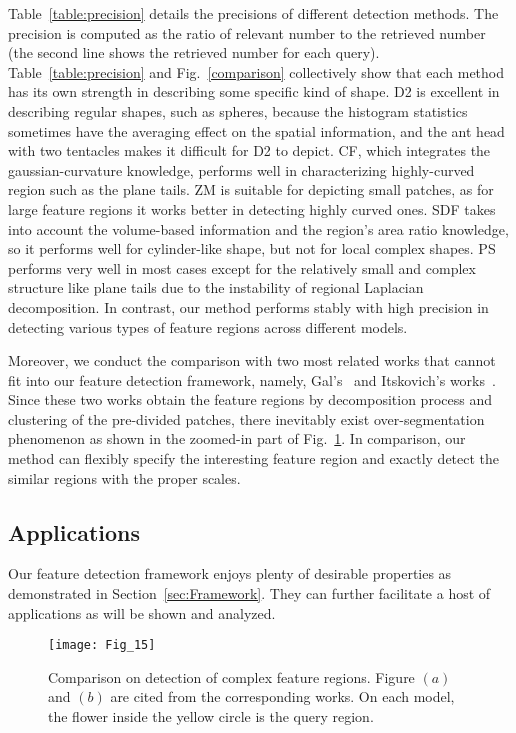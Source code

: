 Table~\ref{table:precision} details the precisions of different
detection methods. The precision is computed as the ratio of relevant
number to the retrieved number (the second line shows the retrieved
number for each query).  Table~\ref{table:precision} and
Fig.~\ref{comparison} collectively show that each method has its own
strength in describing some specific kind of shape. D2 is excellent
in describing regular shapes, such as spheres, because the histogram
statistics sometimes have the averaging effect on the spatial
information, and the ant head with two tentacles makes it difficult
for D2 to depict. CF, which integrates the gaussian-curvature
knowledge, performs well in characterizing highly-curved region such as
the plane tails. ZM is suitable for depicting small patches, as for
large feature regions it works better in detecting highly curved ones.
SDF takes into account the volume-based information and the region's
area ratio knowledge, so it performs well for cylinder-like shape, but
not for local complex shapes. PS performs very well in most cases except
for the relatively small and complex structure like plane tails due to
the instability of regional Laplacian decomposition. In contrast, our
method performs stably with high precision in detecting various types
of feature regions across different models.

Moreover, we conduct the comparison with two most related works that
cannot fit into our feature detection framework, namely,
Gal's~\cite{Gal2006} and Itskovich's works~\cite{Itskovich2011}.
Since these two works obtain the feature regions by decomposition
process and clustering of the pre-divided patches, there inevitably
exist over-segmentation phenomenon as shown in the zoomed-in part of
Fig.~\ref{Gal}. In comparison, our method can flexibly specify the
interesting feature region and exactly detect the similar regions with
the proper scales.

\subsection{Applications}

Our feature detection framework enjoys plenty of desirable properties
as demonstrated in Section~\ref{sec:Framework}. They can further
facilitate a host of applications as will be shown and analyzed.

\begin{figure}[!to]
\texttt{[image: Fig\_15]}
\caption[Comparisons of detecting complex feature regions.]
  {Comparison on detection of complex feature regions. Figure
  $(a)$ and $(b)$ are cited from the corresponding works. On each
  model, the flower inside the yellow circle is the query region.}
\label{Gal}
\end{figure}

